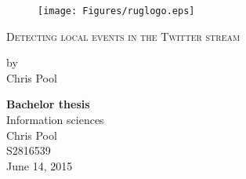 \begin{titlepage}

\begin{figure}[h!] %

 \texttt{[image: Figures/ruglogo.eps]} 
\end{figure}
\begin{center}

\vspace{30 mm}
\begingroup \linespread{1,75} \selectfont 
\textsc{\LARGE Detecting local events in the Twitter stream}\\[1,5cm]
\endgroup


by\\[0,5cm]
Chris Pool\\[2,5cm]


\end{center}
\vfill
\textbf{Bachelor thesis}\\
Information sciences\\
Chris Pool\\
S2816539\\
June 14, 2015



\end{titlepage}